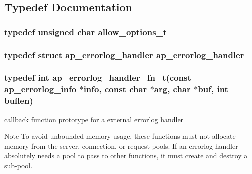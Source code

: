 \subsection{Typedef Documentation}
\subsubsection[{\texorpdfstring{allow\+\_\+options\+\_\+t}{allow_options_t}}]{\setlength{\rightskip}{0pt plus 5cm}typedef unsigned char {\bf allow\+\_\+options\+\_\+t}}\hypertarget{group__APACHE__CORE__HTTPD_ga690d446d4d1bb68e9b9ad82e1de6faa2}{}\label{group__APACHE__CORE__HTTPD_ga690d446d4d1bb68e9b9ad82e1de6faa2}
\subsubsection[{\texorpdfstring{ap\+\_\+errorlog\+\_\+handler}{ap_errorlog_handler}}]{\setlength{\rightskip}{0pt plus 5cm}typedef struct {\bf ap\+\_\+errorlog\+\_\+handler}  {\bf ap\+\_\+errorlog\+\_\+handler}}\hypertarget{group__APACHE__CORE__HTTPD_ga484307f4ac138544ebec225b0f4f910d}{}\label{group__APACHE__CORE__HTTPD_ga484307f4ac138544ebec225b0f4f910d}
\subsubsection[{\texorpdfstring{ap\+\_\+errorlog\+\_\+handler\+\_\+fn\+\_\+t}{ap_errorlog_handler_fn_t}}]{\setlength{\rightskip}{0pt plus 5cm}typedef {\bf int} ap\+\_\+errorlog\+\_\+handler\+\_\+fn\+\_\+t(const {\bf ap\+\_\+errorlog\+\_\+info} $\ast${\bf info}, const char $\ast${\bf arg}, char $\ast${\bf buf}, {\bf int} {\bf buflen})}\hypertarget{group__APACHE__CORE__HTTPD_gae2b87862d08783b06d2f1b6dfb161bca}{}\label{group__APACHE__CORE__HTTPD_gae2b87862d08783b06d2f1b6dfb161bca}
callback function prototype for a external errorlog handler \begin{DoxyNote}{Note}
To avoid unbounded memory usage, these functions must not allocate memory from the server, connection, or request pools. If an errorlog handler absolutely needs a pool to pass to other functions, it must create and destroy a sub-\/pool. 
\end{DoxyNote}
